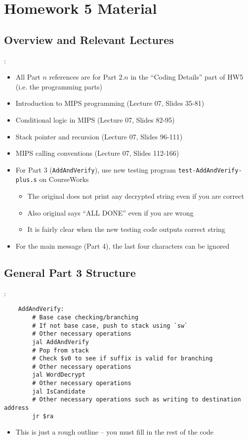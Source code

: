 \documentclass{../slides}
\begin{document}
\section{Homework 5 Material}
\subsection{Overview and Relevant Lectures}
\begin{frame}{\secname: \subsecname}
    \begin{itemize}
        \item All Part $n$ references are for Part $2.n$ in the \enquote{Coding Details} part of HW5 (i.e. the programming parts)
        \item Introduction to MIPS programming (Lecture 07, Slides 35-81)
        \item Conditional logic in MIPS (Lecture 07, Slides 82-95)
        \item Stack pointer and recursion (Lecture 07, Slides 96-111)
        \item MIPS calling conventions (Lecture 07, Slides 112-166)
        \item For Part 3 (\lstinline{AddAndVerify}), use new testing program \lstinline{test-AddAndVerify-plus.s} on CourseWorks
        \begin{itemize}
            \item The original does not print any decrypted string even if you are correct
            \item Also original says \enquote{ALL DONE} even if you are wrong
            \item It is fairly clear when the new testing code outputs correct string
        \end{itemize}
        \item For the main message (Part 4), the last four characters can be ignored
    \end{itemize}
\end{frame}

\subsection{General Part 3 Structure}
\begin{frame}[fragile]{\secname: \subsecname}
    \begin{lstlisting}
    AddAndVerify:
        # Base case checking/branching
        # If not base case, push to stack using `sw`
        # Other necessary operations
        jal AddAndVerify
        # Pop from stack
        # Check $v0 to see if suffix is valid for branching
        # Other necessary operations
        jal WordDecrypt
        # Other necessary operations
        jal IsCandidate
        # Other necessary operations such as writing to destination address
        jr $ra
    \end{lstlisting}
    \begin{itemize}
        \item This is just a rough outline -- you must fill in the rest of the code
    \end{itemize}
\end{frame}
\end{document}
